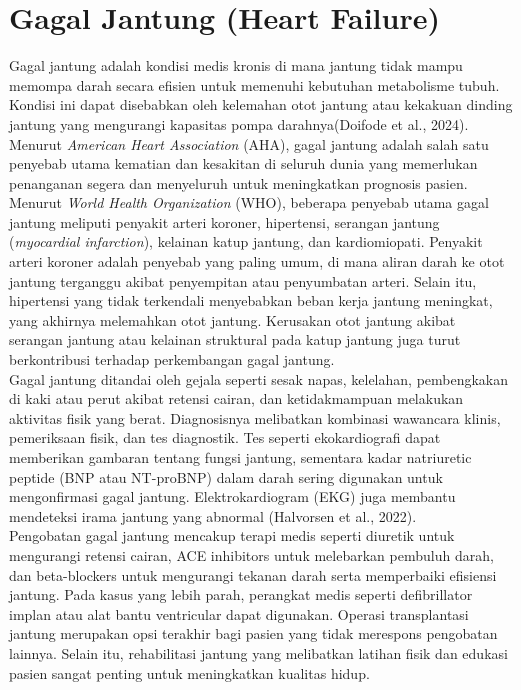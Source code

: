 \documentclass[english,12pt,a4paper,openany]{book}
\begin{document}
	\section{Gagal Jantung (Heart Failure)}
	Gagal jantung adalah kondisi medis kronis di mana jantung tidak mampu memompa darah secara efisien untuk memenuhi kebutuhan metabolisme tubuh. Kondisi ini dapat disebabkan oleh kelemahan otot jantung atau kekakuan dinding jantung yang mengurangi kapasitas pompa darahnya(Doifode et al., 2024). Menurut \textit{American Heart Association} (AHA), gagal jantung adalah salah satu penyebab utama kematian dan kesakitan di seluruh dunia yang memerlukan penanganan segera dan menyeluruh untuk meningkatkan prognosis pasien.\\
	
	Menurut  \textit{World Health Organization} (WHO), beberapa penyebab utama gagal jantung meliputi penyakit arteri koroner, hipertensi, serangan jantung (\textit{myocardial infarction}), kelainan katup jantung, dan kardiomiopati. Penyakit arteri koroner adalah penyebab yang paling umum, di mana aliran darah ke otot jantung terganggu akibat penyempitan atau penyumbatan arteri. Selain itu, hipertensi yang tidak terkendali menyebabkan beban kerja jantung meningkat, yang akhirnya melemahkan otot jantung. Kerusakan otot jantung akibat serangan jantung atau kelainan struktural pada katup jantung juga turut berkontribusi terhadap perkembangan gagal jantung.\\
	
	Gagal jantung ditandai oleh gejala seperti sesak napas, kelelahan, pembengkakan di kaki atau perut akibat retensi cairan, dan ketidakmampuan melakukan aktivitas fisik yang berat. Diagnosisnya melibatkan kombinasi wawancara klinis, pemeriksaan fisik, dan tes diagnostik. Tes seperti ekokardiografi dapat memberikan gambaran tentang fungsi jantung, sementara kadar natriuretic peptide (BNP atau NT-proBNP) dalam darah sering digunakan untuk mengonfirmasi gagal jantung. Elektrokardiogram (EKG) juga membantu mendeteksi irama jantung yang abnormal (Halvorsen et al., 2022).\\
	
	Pengobatan gagal jantung mencakup terapi medis seperti diuretik untuk mengurangi retensi cairan, ACE inhibitors untuk melebarkan pembuluh darah, dan beta-blockers untuk mengurangi tekanan darah serta memperbaiki efisiensi jantung. Pada kasus yang lebih parah, perangkat medis seperti defibrillator implan atau alat bantu ventricular dapat digunakan. Operasi transplantasi jantung merupakan opsi terakhir bagi pasien yang tidak merespons pengobatan lainnya. Selain itu, rehabilitasi jantung yang melibatkan latihan fisik dan edukasi pasien sangat penting untuk meningkatkan kualitas hidup.\\
	
\end{document}
